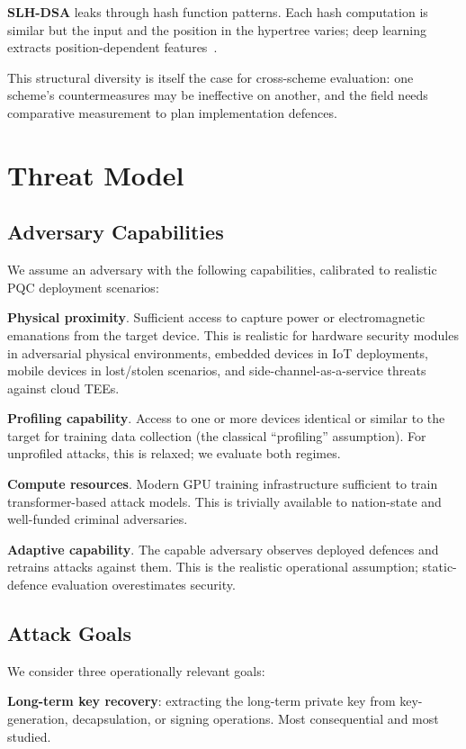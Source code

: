 \documentclass[sigconf,nonacm]{acmart}
\begin{document}
\textbf{SLH-DSA} leaks through hash function patterns. Each hash
computation is similar but the input and the position in the hypertree
varies; deep learning extracts position-dependent
features~\cite{genet2024sphincs}.

This structural diversity is itself the case for cross-scheme
evaluation: one scheme's countermeasures may be ineffective on
another, and the field needs comparative measurement to plan
implementation defences.

\section{Threat Model}

\subsection{Adversary Capabilities}

We assume an adversary with the following capabilities, calibrated to
realistic PQC deployment scenarios:

\textbf{Physical proximity}. Sufficient access to capture power or
electromagnetic emanations from the target device. This is realistic
for hardware security modules in adversarial physical environments,
embedded devices in IoT deployments, mobile devices in lost/stolen
scenarios, and side-channel-as-a-service threats against cloud TEEs.

\textbf{Profiling capability}. Access to one or more devices identical
or similar to the target for training data collection (the
classical ``profiling'' assumption). For unprofiled attacks, this is
relaxed; we evaluate both regimes.

\textbf{Compute resources}. Modern GPU training infrastructure
sufficient to train transformer-based attack models. This is
trivially available to nation-state and well-funded criminal
adversaries.

\textbf{Adaptive capability}. The capable adversary observes deployed
defences and retrains attacks against them. This is the realistic
operational assumption; static-defence evaluation overestimates security.

\subsection{Attack Goals}

We consider three operationally relevant goals:

\textbf{Long-term key recovery}: extracting the long-term private key
from key-generation, decapsulation, or signing operations. Most
consequential and most studied.
\end{document}
